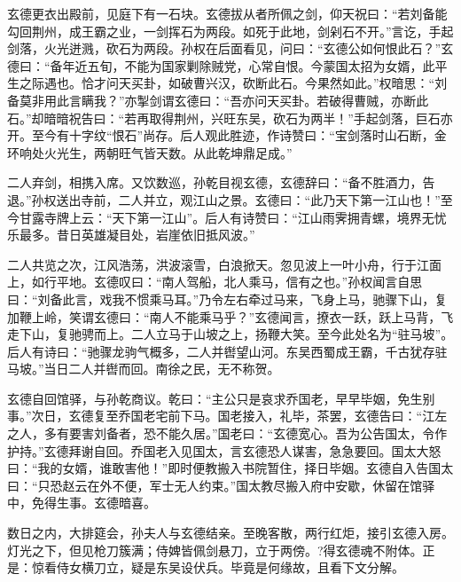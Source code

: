 玄德更衣出殿前，见庭下有一石块。玄德拔从者所佩之剑，仰天祝曰：“若刘备能勾回荆州，成王霸之业，一剑挥石为两段。如死于此地，剑剁石不开。”言讫，手起剑落，火光迸溅，砍石为两段。孙权在后面看见，问曰：“玄德公如何恨此石？”玄德曰：“备年近五旬，不能为国家剿除贼党，心常自恨。今蒙国太招为女婿，此平生之际遇也。恰才问天买卦，如破曹兴汉，砍断此石。今果然如此。”权暗思：“刘备莫非用此言瞒我？”亦掣剑谓玄德曰：“吾亦问天买卦。若破得曹贼，亦断此石。”却暗暗祝告曰：“若再取得荆州，兴旺东吴，砍石为两半！”手起剑落，巨石亦开。至今有十字纹“恨石”尚存。后人观此胜迹，作诗赞曰：“宝剑落时山石断，金环响处火光生，两朝旺气皆天数。从此乾坤鼎足成。”

二人弃剑，相携入席。又饮数巡，孙乾目视玄德，玄德辞曰：“备不胜酒力，告退。”孙权送出寺前，二人并立，观江山之景。玄德曰：“此乃天下第一江山也！”至今甘露寺牌上云：“天下第一江山”。后人有诗赞曰：“江山雨霁拥青螺，境界无忧乐最多。昔日英雄凝目处，岩崖依旧抵风波。”

二人共览之次，江风浩荡，洪波滚雪，白浪掀天。忽见波上一叶小舟，行于江面上，如行平地。玄德叹曰：“南人驾船，北人乘马，信有之也。”孙权闻言自思曰：“刘备此言，戏我不惯乘马耳。”乃令左右牵过马来，飞身上马，驰骤下山，复加鞭上岭，笑谓玄德曰：“南人不能乘马乎？”玄德闻言，撩衣一跃，跃上马背，飞走下山，复驰骋而上。二人立马于山坡之上，扬鞭大笑。至今此处名为“驻马坡”。后人有诗曰：“驰骤龙驹气概多，二人并辔望山河。东吴西蜀成王霸，千古犹存驻马坡。”当日二人并辔而回。南徐之民，无不称贺。

玄德自回馆驿，与孙乾商议。乾曰：“主公只是哀求乔国老，早早毕姻，免生别事。”次日，玄德复至乔国老宅前下马。国老接入，礼毕，茶罢，玄德告曰：“江左之人，多有要害刘备者，恐不能久居。”国老曰：“玄德宽心。吾为公告国太，令作护持。”玄德拜谢自回。乔国老入见国太，言玄德恐人谋害，急急要回。国太大怒曰：“我的女婿，谁敢害他！”即时便教搬入书院暂住，择日毕姻。玄德自入告国太曰：“只恐赵云在外不便，军士无人约束。”国太教尽搬入府中安歇，休留在馆驿中，免得生事。玄德暗喜。

数日之内，大排筵会，孙夫人与玄德结亲。至晚客散，两行红炬，接引玄德入房。灯光之下，但见枪刀簇满；侍婢皆佩剑悬刀，立于两傍。?得玄德魂不附体。正是：惊看侍女横刀立，疑是东吴设伏兵。毕竟是何缘故，且看下文分解。